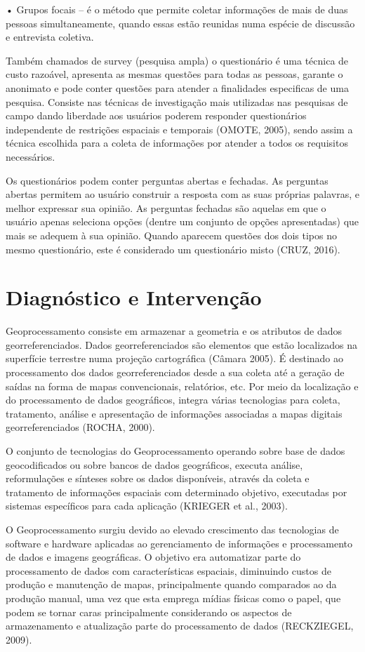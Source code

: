 \documentclass[
	12pt,				%
    oneside,			%
	a4paper,			%
	english,			%
	french,				%
	spanish,			%
	brazil,				%
	]{abntex2}
\begin{document}
•	Grupos focais – é o método que permite coletar informações de mais de duas pessoas simultaneamente, quando essas estão reunidas numa espécie de discussão e entrevista coletiva.


Também chamados de survey (pesquisa ampla) o questionário é uma técnica de custo razoável, apresenta as mesmas questões para todas as pessoas, garante o anonimato e pode conter questões para atender a finalidades especificas de uma pesquisa. Consiste  nas técnicas de investigação mais utilizadas nas pesquisas de campo dando liberdade aos usuários poderem responder questionários independente de restrições espaciais e temporais (OMOTE, 2005), sendo assim a técnica escolhida para a coleta de informações por atender a todos os requisitos necessários.

Os questionários podem conter perguntas abertas e fechadas. As perguntas abertas permitem ao usuário construir a resposta com as suas próprias palavras, e melhor expressar sua opinião. As perguntas fechadas são aquelas em que o usuário apenas seleciona opções (dentre um conjunto de opções apresentadas) que mais se adequem à sua opinião. Quando aparecem questões dos dois tipos no mesmo questionário, este é considerado um questionário misto (CRUZ, 2016).


\section{Diagnóstico e Intervenção}
Geoprocessamento consiste em armazenar a geometria e os atributos de dados georreferenciados. Dados georreferenciados são elementos que estão localizados na superfície terrestre numa projeção cartográfica (Câmara 2005). É destinado ao processamento dos dados georreferenciados desde a sua coleta até a geração de saídas na forma de mapas convencionais, relatórios, etc. Por meio da localização e do processamento de dados geográficos, integra várias tecnologias para coleta, tratamento, análise e apresentação de informações associadas a mapas digitais georreferenciados (ROCHA, 2000).

O conjunto de tecnologias do Geoprocessamento operando sobre base de dados geocodificados ou sobre bancos de dados geográficos, executa análise, reformulações e sínteses sobre os dados disponíveis, através da coleta e tratamento de informações espaciais com determinado objetivo, executadas por sistemas específicos para cada aplicação (KRIEGER et al., 2003). 

O Geoprocessamento surgiu devido ao elevado crescimento das tecnologias de software e hardware aplicadas ao gerenciamento de informações e processamento de dados e imagens geográficas. O objetivo era automatizar parte do processamento de dados com características espaciais, diminuindo custos de produção e manutenção de mapas, principalmente quando comparados ao da produção manual, uma vez que esta emprega mídias físicas como o papel, que podem se tornar caras principalmente considerando os aspectos de armazenamento e atualização parte do processamento de dados (RECKZIEGEL, 2009).
\end{document}

